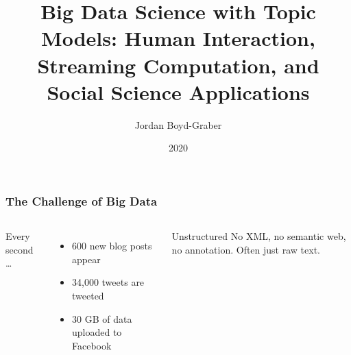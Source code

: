 \documentclass[xcolor=dvipsnames]{beamer}
\title{Big Data Science with Topic Models: Human Interaction, Streaming Computation, and Social Science Applications}
\author{Jordan Boyd-Graber}
\date{2020}
\begin{document}

\frame{\titlepage}



\begin{frame}
\frametitle{The Challenge of Big Data}

\begin{columns}


Every second \dots
\begin{itemize}
  \item 600 new blog posts appear
  \item 34,000 tweets are tweeted
  \item 30 GB of data uploaded to Facebook
\end{itemize}
\pause

\begin{block}{Unstructured}
  No XML, no semantic web, no annotation.  Often just raw text.
\end{block}



\end{columns}

\end{frame}
\end{document}
